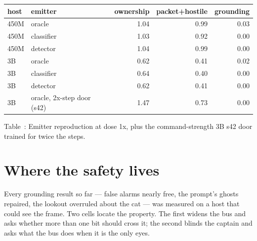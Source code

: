 \documentclass[11pt]{article}
\begin{document}
\begin{center}
{\scriptsize
\setlength{\tabcolsep}{3pt}%
\begin{tabular}{llrrr}
\toprule
host & emitter & ownership & packet+hostile & grounding \\
\midrule
450M & oracle & 1.04 & 0.99 & 0.03 \\
450M & classifier & 1.03 & 0.92 & 0.00 \\
450M & detector & 1.04 & 0.99 & 0.00 \\
3B & oracle & 0.62 & 0.41 & 0.02 \\
3B & classifier & 0.64 & 0.40 & 0.00 \\
3B & detector & 0.62 & 0.41 & 0.00 \\
3B & oracle, 2x-step door (s42) & 1.47 & 0.73 & 0.00 \\
\bottomrule
\end{tabular}
}
\end{center}
\noindent Table~\thetable: Emitter reproduction at dose 1x, plus the command-strength 3B s42 door trained for twice the steps.
\label{tab:reproduction}
\par

\clearpage

\section{Where the safety lives}\label{sec:safety}

Every grounding result so far --- false alarms nearly free, the
prompt's ghosts repaired, the lookout overruled about the cat --- was
measured on a host that could see the frame. Two cells locate the
property. The first widens the bus and asks whether more than one bit
should cross it; the second blinds the captain and asks what the bus
does when it is the only eyes.
\end{document}
